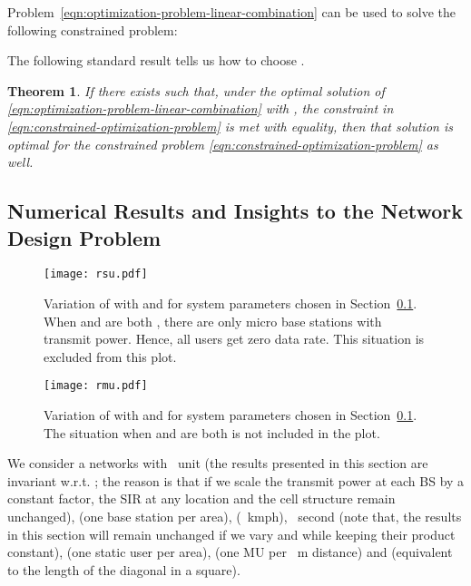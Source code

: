 \documentclass[10pt,journal]{IEEEtran}
\newtheorem{theorem}{Theorem}
\begin{document}
Problem~\eqref{eqn:optimization-problem-linear-combination} can be used to solve the following constrained problem:


The following standard result tells us how to choose .
\begin{theorem}\label{theorem:constrained-and-unconstrained}
 If there exists  such that, under the optimal solution of \eqref{eqn:optimization-problem-linear-combination} 
 with , the constraint in \eqref{eqn:constrained-optimization-problem} is met with equality, then that solution 
 is optimal for the constrained problem \eqref{eqn:constrained-optimization-problem} as well.
\end{theorem}




\subsection{Numerical Results and Insights to the Network Design Problem}\label{subsection:numerical-work-on-stochastic-geometry-results}



\begin{figure}[!t]
\begin{center}
\texttt{[image: rsu.pdf]}
\end{center}
\vspace{-4mm}
\caption{Variation of  with  and  for system parameters chosen in 
Section~\ref{subsection:numerical-work-on-stochastic-geometry-results}. When  and  are both , 
there are only micro base stations with  transmit power. Hence, all users get 
 zero data rate. This situation is excluded from this plot.}
\label{fig:rsu}
\vspace{-3mm}
\end{figure}

\begin{figure}[!t]
\begin{center}
\texttt{[image: rmu.pdf]}
\end{center}
\vspace{-4mm}
\caption{Variation of  with  and  for system parameters chosen in 
Section~\ref{subsection:numerical-work-on-stochastic-geometry-results}. The situation when  and  are both  is 
not included in the plot.}
\label{fig:rmu}
\end{figure}


We consider a networks with ~unit (the results presented in this section are invariant w.r.t. ; the reason 
is that if we scale the transmit power at each BS by a constant factor, the SIR at any location and the 
cell structure remain unchanged),  (one base station per 
 area),  (~kmph), 
~second (note that, the results in this section will remain unchanged if we vary  and 
 while keeping their product constant), 
 (one static user per  area), 
 (one MU per ~m distance) and  
(equivalent to the length of the 
diagonal in a  square). 
\end{document}
